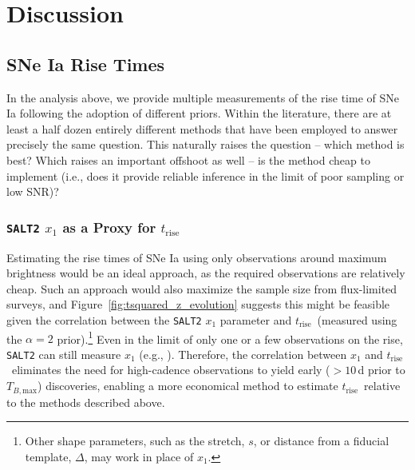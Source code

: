 \documentclass[twocolumn]{aastex63}
\newcommand{\trise}{$t_\mathrm{rise}$}
\newcommand{\tbmax}{$T_{B,\mathrm{max}}$}
\begin{document}
\section{Discussion}

\subsection{SNe Ia Rise Times}

In the analysis above, we provide multiple measurements of the rise time of SNe
Ia following the adoption of different priors. Within the literature, there are
at least a half dozen entirely different methods that have been employed to
answer precisely the same question. This naturally raises the question -- which
method is best? Which raises an important offshoot as well -- is the method
cheap to implement (i.e., does it provide reliable inference in the limit of
poor sampling or low SNR)?

\subsubsection{\texttt{SALT2} $x_1$ as a Proxy for \trise}\label{sec:x1_rise}

Estimating the rise times of SNe Ia using only observations around maximum
brightness would be an ideal approach, as the required observations are
relatively cheap. Such an approach would also maximize the sample size from
flux-limited surveys, and Figure~\ref{fig:tsquared_z_evolution} suggests this
might be feasible given the correlation between the \texttt{SALT2} $x_1$
parameter and \trise\ (measured using the $\alpha = 2$ prior).\footnote{Other
shape parameters, such as the stretch, $s$, or distance from a fiducial
template, $\Delta$, may work in place of $x_1$.} Even in the limit of only one
or a few observations on the rise, \texttt{SALT2} can still measure $x_1$
(e.g., \citealt{Scolnic18a}). Therefore, the correlation between $x_1$ and
\trise\ eliminates the need for high-cadence observations to yield early ($>
10$\,d prior to \tbmax) discoveries, enabling a more economical method to
estimate \trise\ relative to the methods described above.
\end{document}
